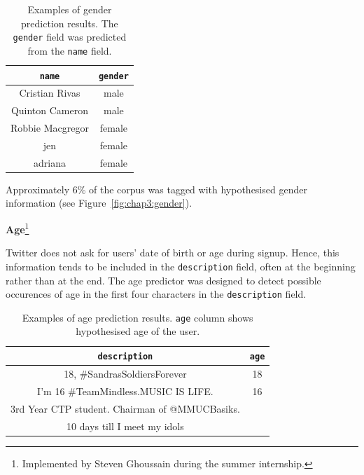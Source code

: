 \documentclass[a4paper,12pt,twoside,openright]{report}
\newcommand{\tb}{\vspace{10pt} \textbf}
\newcommand{\tx}{\texttt}
\begin{document}
\begin{table}[htbp]
\vspace{-0.5cm}
\begin{center}
\begin{tabular}{ c | c }
 \tx{name} & \tx{gender} \\ \hline
 Cristian Rivas & male \\
 Quinton Cameron & male \\
 Robbie Macgregor & female \\
 jen & female \\ 
 adriana & female \\ \hline
\end{tabular}
\end{center}
\caption[Examples of gender prediction results.]{Examples of gender prediction results. The \tx{gender} field was predicted from the \tx{name} field.}
\label{tab:chap3:gender_results}
\vspace{-0.3cm}
\end{table}

Approximately 6\% of the corpus was tagged with hypothesised gender information (see Figure~\ref{fig:chap3:gender}).

\tb{Age}\footnote{Implemented by Steven Ghoussain during the summer internship.}

Twitter does not ask for users' date of birth or age during signup. Hence, this information tends to be included in the \tx{description} field, often at the beginning rather than at the end. The age predictor was designed to detect possible occurences of age in the first four characters in the \tx{description} field. 

\begin{table}[htbp]
\begin{center}
\begin{tabular}{ c | c }
 \tx{description} & \tx{age} \\ \hline
 18, \#SandrasSoldiersForever & 18 \\
 I'm 16 \#TeamMindless.MUSIC IS LIFE. & 16 \\
 3rd Year CTP student. Chairman of @MMUCBasiks. &  \\
 10 days till I meet my idols & \\ \hline
\end{tabular}
\end{center}
\caption[Examples of age prediction results.]{Examples of age prediction results. \tx{age} column shows hypothesised age of the user.}
\label{tab:chap3:age_results}
\end{table}
\end{document}
